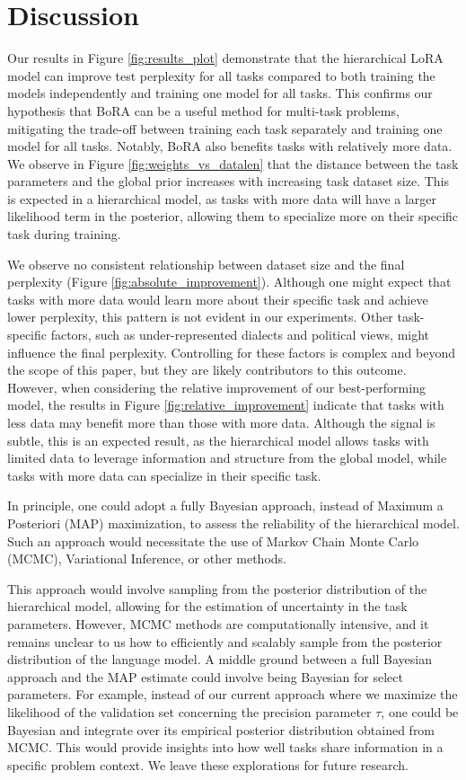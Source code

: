 \documentclass[fullpaper]{nldl}
\begin{document}
\section{Discussion} \label{sec:discussion}
Our results in Figure \ref{fig:results_plot} demonstrate that the hierarchical LoRA model can improve test perplexity for all tasks compared to both training the models independently and training one model for all tasks. This confirms our hypothesis that BoRA can be a useful method for multi-task problems, mitigating the trade-off between training each task separately and training one model for all tasks. Notably, BoRA also benefits tasks with relatively more data.
We observe in Figure \ref{fig:weights_vs_datalen} that the distance between the task parameters and the global prior increases with increasing task dataset size. This is expected in a hierarchical model, as tasks with more data will have a larger likelihood term in the posterior, allowing them to specialize more on their specific task during training.

We observe no consistent relationship between dataset size and the final perplexity (Figure \ref{fig:absolute_improvement}). Although one might expect that tasks with more data would learn more about their specific task and achieve lower perplexity, this pattern is not evident in our experiments. Other task-specific factors, such as under-represented dialects and political views, might influence the final perplexity. Controlling for these factors is complex and beyond the scope of this paper, but they are likely contributors to this outcome.
However, when considering the relative improvement of our best-performing model, the results in Figure \ref{fig:relative_improvement} indicate that tasks with less data may benefit more than those with more data. Although the signal is subtle, this is an expected result, as the hierarchical model allows tasks with limited data to leverage information and structure from the global model, while tasks with more data can specialize in their specific task.

In principle, one could adopt a fully Bayesian approach, instead of Maximum a Posteriori (MAP) maximization, to assess the reliability of the hierarchical model. Such an approach would necessitate the use of Markov Chain Monte Carlo (MCMC), Variational Inference, or other methods. 

This approach would involve sampling from the posterior distribution of the hierarchical model, allowing for the estimation of uncertainty in the task parameters. However, MCMC methods are computationally intensive, and it remains unclear to us how to efficiently and scalably sample from the posterior distribution of the language model.
A middle ground between a full Bayesian approach and the MAP estimate could involve being Bayesian for select parameters. For example, instead of our current approach where we maximize the likelihood of the validation set concerning the precision parameter $\tau$, one could be Bayesian and integrate over its empirical posterior distribution obtained from MCMC. This would provide insights into how well tasks share information in a specific problem context.
We leave these explorations for future research.
\end{document}
